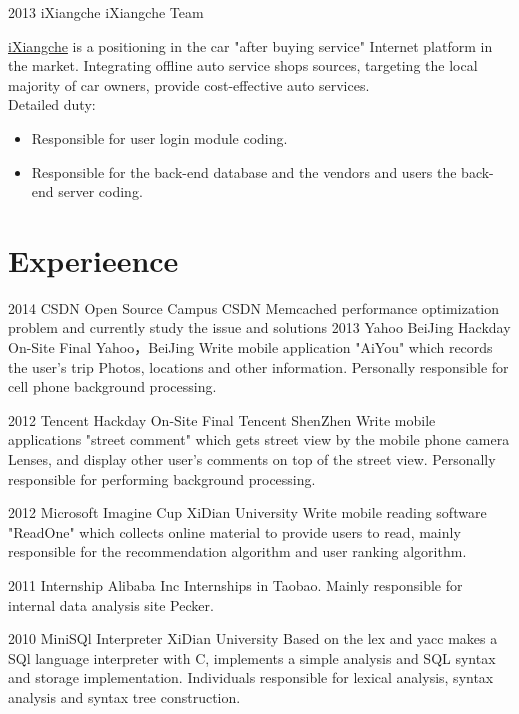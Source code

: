 \documentclass[]{friggeri-cv} %
\begin{document}
\begin{entrylist}
{\begin{itemize}
\end{itemize}
}
\entry
{2013}
{iXiangche}
{iXiangche Team}
{\href{http://www.ixiangche.com/}{iXiangche} is a positioning in the car "after buying service" Internet platform in the market. Integrating offline auto service shops sources, targeting the local majority of car owners, provide cost-effective auto services.\\
Detailed duty:
\begin{itemize}
  \item Responsible for user login module coding.
  \item Responsible for the back-end database and the vendors and users the back-end server coding.
\end{itemize}

}
\end{entrylist}

\section{Experieence}

\begin{entrylist}
\entry
{2014}
{CSDN Open Source Campus}
{CSDN}
{Memcached performance optimization problem and currently study the issue and solutions}
\entry
{2013}
{Yahoo BeiJing Hackday On-Site Final}
{Yahoo，BeiJing}
{Write mobile application "AiYou" which records the user's trip Photos, locations and other information. Personally responsible for cell phone background processing.}

\entry
{2012}
{Tencent Hackday On-Site Final}
{Tencent ShenZhen}
{Write mobile applications "street comment" which gets street view by the mobile phone camera
Lenses, and display other user's comments on top of the street view.
Personally responsible for performing background processing.}

\entry
{2012}
{Microsoft Imagine Cup}
{XiDian University}
{Write mobile reading software "ReadOne" which collects online material to provide users to read, mainly responsible for the recommendation algorithm and user ranking algorithm.}

\entry
{2011}
{Internship}
{Alibaba Inc}
{Internships in Taobao. Mainly responsible for internal data analysis site Pecker.}


\entry
{2010}
{MiniSQl Interpreter}
{XiDian University}
{Based on the lex and yacc makes a SQl language interpreter with C, implements a simple analysis and SQL syntax
and storage implementation. Individuals responsible for lexical analysis, syntax analysis and syntax tree construction. }

\end{entrylist}
\end{document}

